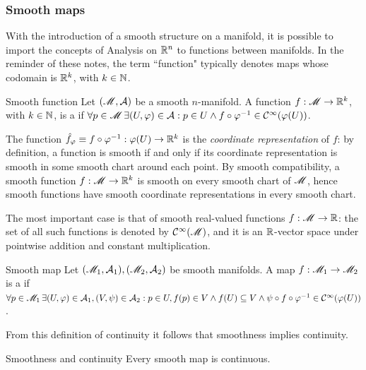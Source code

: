 \subsubsection{Smooth maps}

With the introduction of a smooth structure on a manifold, it is possible to import the concepts of Analysis on $ \mathbb{R}^n $ to functions between manifolds. In the reminder of these notes, the term ``function" typically denotes maps whose codomain is $ \mathbb{R}^k $, with $ k \in \mathbb{N} $.

\begin{definition}{Smooth function}{}
  Let $ (\mathscr{M} , \mathcal{A}) $ be a smooth $ n $-manifold. A function $ f : \mathscr{M} \rightarrow \mathbb{R}^k $, with $ k \in \mathbb{N} $, is a  if $ \forall p \in \mathscr{M} \, \exists (U , \varphi) \in \mathcal{A} : p \in U \land f \circ \varphi^{-1} \in \mathcal{C}^{\infty}(\varphi(U)) $.
\end{definition}

The function $ \hat{f}_\varphi \equiv f \circ \varphi^{-1} : \varphi(U) \rightarrow \mathbb{R}^k $ is the \emph{coordinate representation} of $ f $: by definition, a function is smooth if and only if its coordinate representation is smooth in some smooth chart around each point. By smooth compatibility, a smooth function $ f : \mathscr{M} \rightarrow \mathbb{R}^k $ is smooth on every smooth chart of $ \mathscr{M} $, hence smooth functions have smooth coordinate representations in every smooth chart.

The most important case is that of smooth real-valued functions $ f : \mathscr{M} \rightarrow \mathbb{R} $: the set of all such functions is denoted by $ \mathcal{C}^{\infty}(\mathscr{M}) $, and it is an $ \mathbb{R} $-vector space under pointwise addition and constant multiplication.

\begin{definition}{Smooth map}{}
  Let $ (\mathscr{M}_1 , \mathcal{A}_1) , (\mathscr{M}_2 , \mathcal{A}_2) $ be smooth manifolds. A map $ f : \mathscr{M}_1 \rightarrow \mathscr{M}_2 $ is a  if $ \forall p \in \mathscr{M}_1 \, \exists (U,\varphi) \in \mathcal{A}_1 , (V,\psi) \in \mathcal{A}_2 : p \in U , f(p) \in V \land f(U) \subseteq V \land \psi \circ f \circ \varphi^{-1} \in \mathcal{C}^{\infty}(\varphi(U)) $.
\end{definition}

From this definition of continuity it follows that smoothness implies continuity.

\begin{proposition}{Smoothness and continuity}{}
  Every smooth map is continuous.
\end{proposition}

